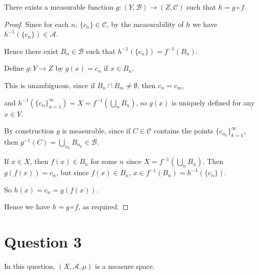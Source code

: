 \documentclass{unswmaths}
\begin{document}
\begin{lemma}
    There exists a measurable function $g:(Y,\mathcal{B})\rightarrow (Z,\mathcal{C})$
    such that $h = g\circ f$.
\end{lemma}
\begin{proof}
    Since for each $n$, $\{c_n\} \in \mathcal{C}$, by the measurability
    of $h$ we have $h^{-1}(\{c_n\}) \in \mathcal{A}$.
    
    Hence there exist $B_n \in \mathcal{B}$ such that $h^{-1}(\{c_n\}) = f^{-1}(B_n)$.
    
    Define $g:Y\rightarrow Z$ by $g(x) = c_n$ if $x \in B_n$. 
    
    This is unambiguous, since if $B_n \cap B_m \neq \emptyset$, then $c_n = c_m$,
    
    and $h^{-1}(\{c_n\}_{n=1}^\infty) = X = f^{-1}(\bigcup_{n} B_n)$,
    so $g(x)$ is uniquely defined for any $x \in Y$.
    
    By construction $g$ is measurable, since if $C \in \mathcal{C}$
    contains the points $\{c_{n_k}\}_{k=1}^\infty$, then $g^{-1}(C) = \bigcup_{n_k} B_{n_k} \in \mathcal{B}$.
    
    If $x \in X$, then $f(x) \in B_n$ for some $n$ since $X = f^{-1}(\bigcup_n B_n)$.
    Then $g(f(x)) = c_n$, but since $f(x) \in B_n$, $x \in f^{-1}(B_n) = h^{-1}(\{c_n\})$.
    
    So $h(x) = c_n = g(f(x))$.
    
    Hence we have $h = g\circ f$, as required.
\end{proof}

    
\section*{Question 3}
    In this question, $(X,\mathcal{A},\mu)$ is a measure space.
    
\end{document}
